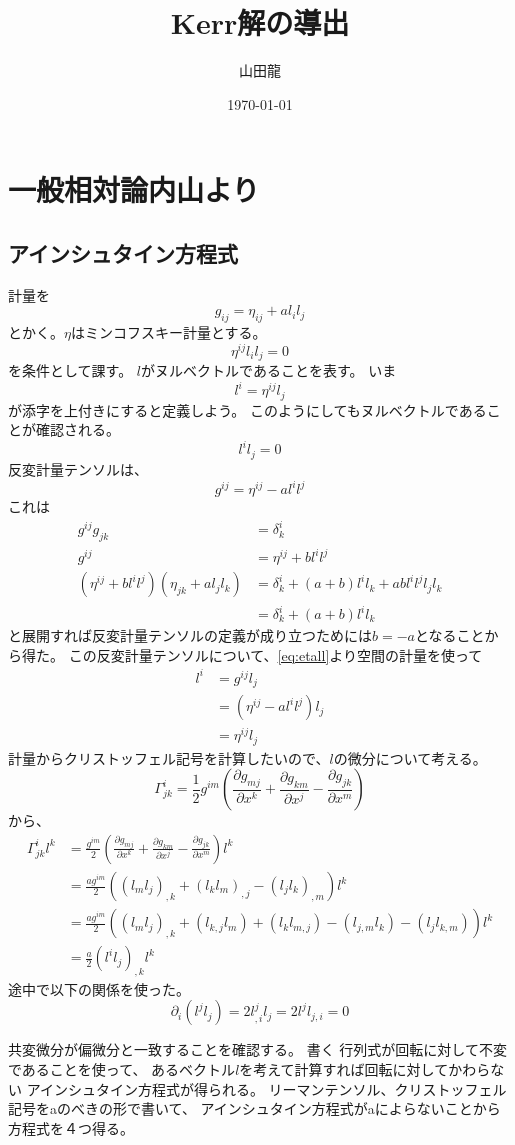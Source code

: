 \documentclass[twocolumn]{jsarticle}
\date{\today}
\author{山田龍}
\title{Kerr解の導出}
\newcommand{\pder}[2][]{\frac{\partial#1}{\partial#2}}
\newcommand{\pderx}[2][]{\pder[#1]{x^{#2}}}
\newcommand{\pdergx}[2][]{\pderx[g_{#1}]{#2}}
\newcommand{\half}{\frac{1}{2}}
\newcommand{\beq}{\begin{equation}}
\newcommand{\eeq}{\end{equation}}
\newcommand{\GaT}[3]{\Gamma^{#1}_{#2 #3}}
\newcommand{\Christfinside}[3]{\pdergx[#3 #1]{#2} + \pdergx[#2 #3]{#1} - \pdergx[#1 #2]{#3}}
\newcommand{\Christf}[4]{\Gamma^{#1}_{#2 #3}=\half g^{#1 #4}(\Christfinside{#2}{#3}{#4})}
\begin{document}
\maketitle
\section{一般相対論内山より}
\subsection{アインシュタイン方程式}
計量を
\beq
g_{ij} = \eta_{ij} + al_il_j
\eeq
とかく。$\eta$はミンコフスキー計量とする。
\beq\label{eq:etall}
    \eta^{ij} l_il_j = 0
\eeq
を条件として課す。
$l$がヌルベクトルであることを表す。
いま
\beq
l^i = \eta^{ij}l_j
\eeq
が添字を上付きにすると定義しよう。
このようにしてもヌルベクトルであることが確認される。
\beq
    l^il_j = 0
\eeq
反変計量テンソルは、
\beq
g^{ij} = \eta^{ij} - al^il^j
\eeq
これは
\begin{align}
    g^{ij}g_{jk} &= \delta^i_k\\
    g^{ij} &= \eta^{ij} + bl^il^j\\
    (\eta^{ij} + bl^il^j)(\eta_{jk} + al_jl_k) &= \delta^i_k + (a + b)l^il_k + abl^il^jl_jl_k\\
&= \delta^i_k + (a + b)l^il_k
\end{align}
と展開すれば反変計量テンソルの定義が成り立つためには$b = -a$となることから得た。
この反変計量テンソルについて、\eqref{eq:etall}より空間の計量を使って
\begin{align}
    l^i &= g^{ij}l_j\\
        &= (\eta^{ij}-al^il^j)l_j\\
        &= \eta^{ij}l_j
\end{align}
計量からクリストッフェル記号を計算したいので、$l$の微分について考える。
\beq
\Christf{i}{j}{k}{m}
\eeq
から、
\begin{align}
    \GaT{i}{j}{k}l^k &= \frac{g^{im}}{2}(\Christfinside{j}{k}{m})l^k\\
                     &= \frac{ag^{im}}{2}((l_ml_j)_{,k} + (l_kl_m)_{,j} - (l_jl_k)_{,m})l^k\\
                     &= \frac{ag^{im}}{2}((l_ml_j)_{,k} + (l_{k,j}l_m) + (l_kl_{m,j}) - (l_{j,m}l_k) - (l_jl_{k,m}))l^k\\
                     &= \frac{a}{2}(l^il_j)_{,k}l^k
\end{align}
途中で以下の関係を使った。
\beq
    \partial_i(l^jl_j) = 2 l^j_{,i}l_j = 2 l^j l_{j,i} = 0
\eeq

共変微分が偏微分と一致することを確認する。
書く
行列式が回転に対して不変であることを使って、
あるベクトル$l$を考えて計算すれば回転に対してかわらない
アインシュタイン方程式が得られる。
リーマンテンソル、クリストッフェル記号をaのべきの形で書いて、
アインシュタイン方程式がaによらないことから方程式を４つ得る。


\end{document}
